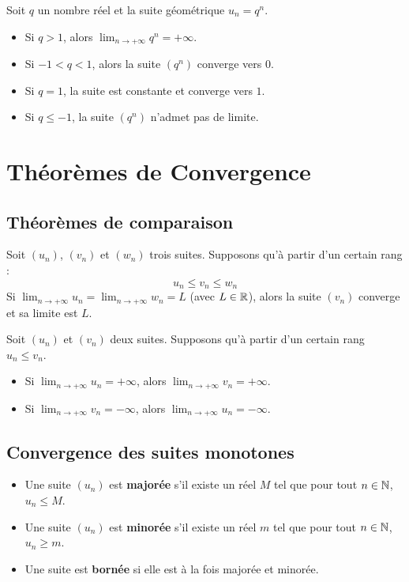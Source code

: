 \begin{propriete}
Soit $q$ un nombre réel et la suite géométrique $u_n = q^n$.
\begin{itemize}
    \item Si $q > 1$, alors $\lim_{n \to +\infty} q^n = +\infty$.
    \item Si $-1 < q < 1$, alors la suite $(q^n)$ converge vers $0$.
    \item Si $q = 1$, la suite est constante et converge vers $1$.
    \item Si $q \le -1$, la suite $(q^n)$ n'admet pas de limite.
\end{itemize}
\end{propriete}

\section{Théorèmes de Convergence}

\subsection{Théorèmes de comparaison}

\begin{theoreme}
Soit $(u_n)$, $(v_n)$ et $(w_n)$ trois suites. Supposons qu'à partir d'un certain rang :
\[
u_n \le v_n \le w_n
\]
Si $\lim_{n \to +\infty} u_n = \lim_{n \to +\infty} w_n = L$ (avec $L \in \mathbb{R}$), alors la suite $(v_n)$ converge et sa limite est $L$.
\end{theoreme}

\begin{theoreme}
Soit $(u_n)$ et $(v_n)$ deux suites. Supposons qu'à partir d'un certain rang $u_n \le v_n$.
\begin{itemize}
    \item Si $\lim_{n \to +\infty} u_n = +\infty$, alors $\lim_{n \to +\infty} v_n = +\infty$.
    \item Si $\lim_{n \to +\infty} v_n = -\infty$, alors $\lim_{n \to +\infty} u_n = -\infty$.
\end{itemize}
\end{theoreme}

\subsection{Convergence des suites monotones}

\begin{definition}
\begin{itemize}
    \item Une suite $(u_n)$ est \textbf{majorée} s'il existe un réel $M$ tel que pour tout $n \in \mathbb{N}$, $u_n \le M$.
    \item Une suite $(u_n)$ est \textbf{minorée} s'il existe un réel $m$ tel que pour tout $n \in \mathbb{N}$, $u_n \ge m$.
    \item Une suite est \textbf{bornée} si elle est à la fois majorée et minorée.
\end{itemize}
\end{definition}


